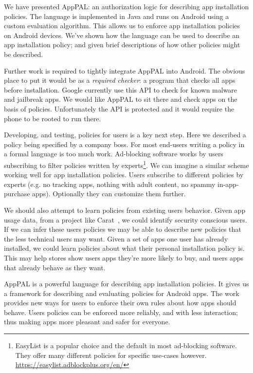 \documentclass[a4paper]{scrartcl}
\begin{document}
We have presented AppPAL: an authorization logic for describing app installation policies.
The language is implemented in Java and runs on Android using a custom evaluation algorithm.
This allows us to enforce app installation policies on Android devices.
We've shown how the language can be used to describe an app installation policy;
  and given brief descriptions of how other policies might be described.

Further work is required to tightly integrate AppPAL into Android.
The obvious place to put it would be as a \emph{required checker}: a program that checks all apps before installation.
Google currently use this API to check for known malware and jailbreak apps.
We would like AppPAL to sit there and check apps on the basis of policies.
Unfortunately the API is protected and it would require the phone to be rooted to run there.

Developing, and testing, policies for users is a key next step.
Here we described a policy being specified by a company boss.
For most end-users writing a policy in a formal language is too much work.
Ad-blocking software works by users subscribing to filter policies written by experts\footnote{EasyList is a popular choice and the default in most ad-blocking software. They offer many different policies for specific use-cases however. \url{https://easylist.adblockplus.org/en/}}.
We can imagine a similar scheme working well for app installation policies.
Users subscribe to different policies by experts (e.g. no tracking apps, nothing with adult content, no spammy in-app-purchase apps).
Optionally they can customize them further.

We should also attempt to learn policies from existing users behavior.
Given app usage data, from a project like Carat~\citep{Oliner:2013ht}, we could identify security conscious users.
If we can infer these users policies we may be able to describe new policies that the less technical users may want.
Given a set of apps one user has already installed, we could learn policies about what their personal installation policy is.
This may help stores show users apps they're more likely to buy, and users apps that already behave as they want.

AppPAL is a powerful language for describing app installation policies.
It gives us a framework for describing and evaluating policies for Android apps.
The work provides new ways for users to enforce their own rules about how apps should behave.
Users policies can be enforced more reliably, and with less interaction;
thus making apps more pleasant and safer for everyone.



\end{document}
